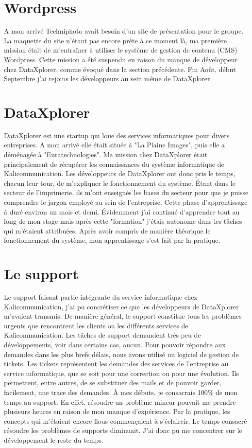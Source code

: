 
\section{Wordpress}
A mon arrivé Techniphoto avait besoin d'un site de présentation pour le groupe. La maquette du site n'étant pas encore prête à ce moment là, ma première mission était de m'entraîner à utiliser le système de gestion de contenu (CMS) Wordpress. Cette mission a été suspendu en raison du manque de développeur chez DataXplorer, comme évoqué dans la section précédente. Fin Août, début Septembre j'ai rejoins les développeurs au sein même de DataXplorer.

\section{DataXplorer}
DataXplorer est une startup qui loue des services informatiques pour divers entreprises. A mon arrivé elle était située à "La Plaine Images", puis elle a déménagée à "Euratechnologies". Ma mission chez DataXplorer était principalement de récupérer les connaissances du système informatique de Kalicommunication. Les développeurs de DataXplorer ont donc pris le temps, chacun leur tour, de m'expliquer le fonctionnement du système. Étant dans le secteur de l'imprimerie, ils m'ont enseignés les bases du secteur pour que je puisse comprendre le jargon employé au sein de l'entreprise. Cette phase d'apprentissage à duré environ un mois et demi. Évidemment j'ai continué d'apprendre tout au long de mon stage mais après cette "formation" j'étais autonome dans les tâches qui m'étaient attribuées.\newline
Après avoir compris de manière théorique le fonctionnement du système, mon apprentissage s'est fait par la pratique.

\section{Le support}
Le support faisant partie intégrante du service informatique chez Kalicommunication, j'ai pu concrétiser ce que les développeurs de DataXplorer m'avaient transmis. De manière général, le support constitue tous les problèmes urgents que rencontrent les clients ou les différents services de Kalicommunication. Les tâches de support demandent très peu de développements, voir dans certains cas, aucun.\newline
Pour pouvoir répondre aux demandes dans les plus brefs délais, nous avons utilisé un logiciel de gestion de tickets. Les tickets représentent les demandes des services de l'entreprise au service informatique, que se soit pour une correction ou pour une évolution. Ils permettent, entre autres, de se substituer des mails et de pouvoir garder, facilement, une trace des demandes.\newline
À mes débuts, je consacrais 100\% de mon temps au support. En effet, résoudre un problème mineur pouvait me prendre plusieurs heures en raison de mon manque d'expérience. Par la pratique, les concepts qui m'étaient encore flous commençaient à s'éclaircir. Le temps consacré résoudre les problèmes de supports diminuait. J'ai donc pu me concentrer sur le développement le reste du temps.

